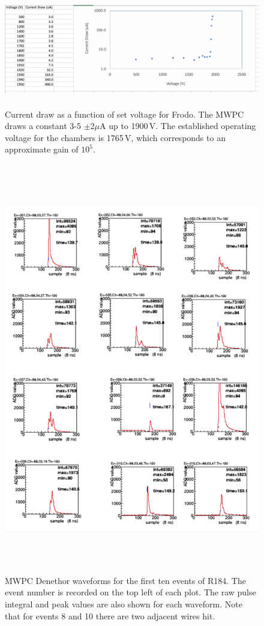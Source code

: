 \documentclass[12pt]{article}
\begin{document}
\begin{figure}[tbph]
\begin{center}
\includegraphics[height=5cm,clip=true]{Current_draw_Frodo}
\caption{Current draw as a function of set voltage for Frodo. The MWPC draws a constant 3-5 $\pm$2$\mu$A up to 1900\,V. The established operating voltage for the chambers is 1765\,V, which corresponds to an approximate gain of $10^5$.
\label{fig:Current_draw_Frodo}}
\end{center}
\end{figure} 

\begin{figure}[tbph]
\begin{center}
\includegraphics[height=18cm,clip=true]{Waveform_Denethor_R184}
\caption{MWPC Denethor waveforms for the first ten events of R184. The event number is recorded on the top left of each plot. The raw pulse integral and peak values are
also shown for each waveform. Note that for events 8 and 10 there are two adjacent wires hit.  
\label{fig:Waveform_Denethor_R184}}
\end{center}
\end{figure} 
\end{document}
